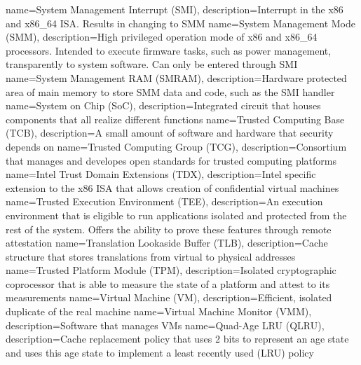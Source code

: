 {
  name=System Management Interrupt (SMI),
  description={Interrupt in the x86 and x86\_64 ISA. Results in changing to SMM}
}
{
  name=System Management Mode (SMM),
  description={High privileged operation mode of x86 and x86\_64 processors. Intended to execute firmware tasks, such
  as power management, transparently to system software. Can only be entered through SMI}
}
{
  name=System Management RAM (SMRAM),
  description={Hardware protected area of main memory to store SMM data and code, such as the
  SMI handler}
}
{
  name=System on Chip (SoC),
  description={Integrated circuit that houses components that all realize different functions}
}
%
{
  name=Trusted Computing Base (TCB),
  description={A small amount of software and hardware that security depends on}
}
{
  name=Trusted Computing Group (TCG),
  description={Consortium that manages and developes open standards for trusted computing platforms}
}
{
  name=Intel Trust Domain Extensions (TDX),
  description={Intel specific extension to the x86 ISA that allows creation of confidential virtual machines}
}
{
  name=Trusted Execution Environment (TEE),
  description={An execution environment that is eligible to run applications isolated and protected from the rest of
  the system. Offers the ability to prove these features through remote attestation}
}
{
  name=Translation Lookaside Buffer (TLB),
  description={Cache structure that stores translations from virtual to physical addresses}
}
{
  name=Trusted Platform Module (TPM),
  description={Isolated cryptographic coprocessor that is able to measure the state of a platform and attest to its measurements}
}
%
{
  name=Virtual Machine (VM),
  description={Efficient, isolated duplicate of the real machine}
}
{
  name=Virtual Machine Monitor (VMM),
  description={Software that manages VMs}
}
%
{
  name=Quad-Age LRU (QLRU),
  description={Cache replacement policy that uses 2 bits to represent an age state and uses this age state to implement
  a least recently used (LRU) policy}
}

